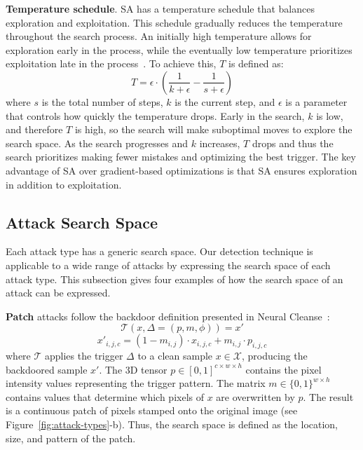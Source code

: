 \documentclass[letterpaper,twocolumn,10pt]{article}
\begin{document}
\textbf{Temperature schedule}. SA has a temperature schedule that balances exploration and exploitation. This schedule gradually reduces the temperature throughout the search process. An initially high temperature allows for exploration early in the process, while the eventually low temperature prioritizes exploitation late in the process~\cite{styblinski1990experiments}. To achieve this, $T$ is defined as:
\begin{equation}
\label{eq:temperature}
    T=\epsilon \cdot (\frac{1}{k+\epsilon}-\frac{1}{s+\epsilon})
\end{equation}
where $s$ is the total number of steps, $k$ is the current step, and $\epsilon$ is a parameter that controls how quickly the temperature drops. Early in the search, $k$ is low, and therefore $T$ is high, so the search will make suboptimal moves to explore the search space. As the search progresses and $k$ increases, $T$ drops and thus the search prioritizes making fewer mistakes and optimizing the best trigger.
The key advantage of SA over gradient-based optimizations is that SA ensures exploration in addition to exploitation.

\subsection{Attack Search Space}
\label{sec:attack-search-space}

Each attack type has a generic search space. Our detection technique is applicable to a wide range of attacks by expressing the search space of each attack type. This subsection gives four examples of how the search space of an attack can be expressed.

\textbf{Patch} attacks follow the backdoor definition presented in Neural Cleanse~\cite{wang2019cleanse}:
$$\mathcal{T}(x,\Delta=(p,m,\phi)) =x'$$
\begin{equation}
\label{eq:general}
x'_{i,j,c} =(1-m_{i,j})\cdot x_{i,j,c}+m_{i,j}\cdot p_{i,j,c}
\end{equation}
where $\mathcal{T}$ applies the trigger $\Delta$ to a clean sample $x \in \mathcal{X}$, producing the backdoored sample $x'$. The 3D tensor $p \in \left[0,1\right]^{c\times w\times h}$ contains the pixel intensity values representing the trigger pattern. The matrix $m \in \{0,1\}^{w\times h}$ contains values that determine which pixels of $x$ are overwritten by $p$. The result is a continuous patch of pixels stamped onto the original image (see Figure~\ref{fig:attack-types}-b). Thus, the search space is defined as the location, size, and pattern of the patch.
\end{document}
